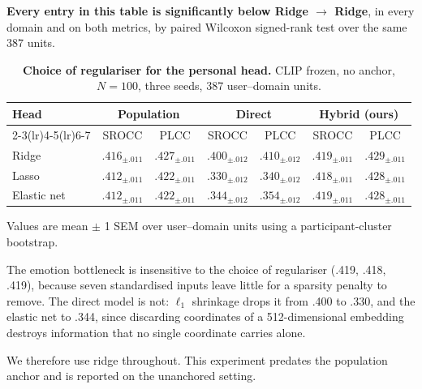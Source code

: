 \textbf{Every entry in this table is significantly below Ridge $\to$ Ridge}, in every domain and on both metrics, by paired Wilcoxon signed-rank test over the same 387 units.
\begin{table}[t]
\centering
\begin{threeparttable}
\caption{\textbf{Choice of regulariser for the personal head.} CLIP frozen, no anchor, $N=100$, three seeds, 387 user--domain units.}
\label{tab:regulariser}
\small
\setlength{\tabcolsep}{4pt}
\begin{tabular}{@{}l cc cc cc@{}}
\toprule
\multirow{2}{*}{Head} & \multicolumn{2}{c}{Population} & \multicolumn{2}{c}{Direct} & \multicolumn{2}{c}{Hybrid (ours)} \\
\cmidrule(lr){2-3}\cmidrule(lr){4-5}\cmidrule(lr){6-7}
 & SROCC & PLCC & SROCC & PLCC & SROCC & PLCC \\
\midrule
Ridge       & $.416_{\pm .011}$ & $.427_{\pm .011}$ & $.400_{\pm .012}$ & $.410_{\pm .012}$ & $\bm{.419_{\pm .011}}$ & $\bm{.429_{\pm .011}}$ \\
Lasso       & $.412_{\pm .011}$ & $.422_{\pm .011}$ & $.330_{\pm .012}$ & $.340_{\pm .012}$ & $.418_{\pm .011}$ & $.428_{\pm .011}$ \\
Elastic net & $.412_{\pm .011}$ & $.422_{\pm .011}$ & $.344_{\pm .012}$ & $.354_{\pm .012}$ & $.419_{\pm .011}$ & $.428_{\pm .011}$ \\
\bottomrule
\end{tabular}
\begin{tablenotes}[flushleft]\footnotesize
\item Values are mean $\pm$ 1 SEM over user--domain units using a participant-cluster bootstrap.
\item The emotion bottleneck is insensitive to the choice of regulariser (.419, .418, .419), because seven standardised inputs leave little for a sparsity penalty to remove. The direct model is not: $\ell_1$ shrinkage drops it from .400 to .330, and the elastic net to .344, since discarding coordinates of a 512-dimensional embedding destroys information that no single coordinate carries alone.
\item We therefore use ridge throughout. This experiment predates the population anchor and is reported on the unanchored setting.
\end{tablenotes}
\end{threeparttable}
\end{table}
